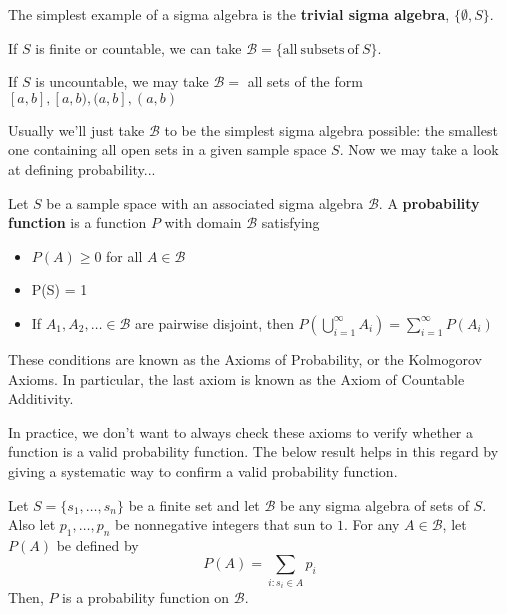 \begin{example}
    The simplest example of a sigma algebra is the \textbf{trivial sigma algebra}, $\{\emptyset, S\}$.
\end{example}

\begin{example}
    If $S$ is finite or countable, we can take $\mathcal{B} = \{\mathrm{all\ subsets\ of\ } S\}$.
\end{example}

\begin{example}
    If $S$ is uncountable, we may take $\mathcal{B} = $ all sets of the form $[a,b], [a,b),(a,b], (a,b)$
\end{example}
\nextp

Usually we'll just take $\mathcal{B}$ to be the simplest sigma algebra possible: the smallest one containing all open sets in a given sample space $S$. 
Now we may take a look at defining probability...
\begin{definition}
    Let $S$ be a sample space with an associated sigma algebra $\mathcal{B}$. A \textbf{probability function} is a function $P$ with domain $\mathcal{B}$ satisfying
    \begin{itemize}
        \item $P(A) \geq 0$ for all $A \in \mathcal{B}$
        \item P(S) = 1
        \item If $A_1, A_2, \dots \in \mathcal{B}$ are pairwise disjoint, then $P(\bigcup_{i=1}^{\infty}{A_i}) = \sum_{i=1}^{\infty}{P(A_i)}$
    \end{itemize}
    These conditions are known as the Axioms of Probability, or the Kolmogorov Axioms. In particular, the last axiom is known as the Axiom of Countable Additivity.
\end{definition}
\nextp

In practice, we don't want to always check these axioms to verify whether a function is a valid probability function. The below result helps in this regard by giving a systematic way to confirm a valid probability function.
\begin{theorem}
    Let $S = \{s_1, \dots, s_n\}$ be a finite set and let $\mathcal{B}$ be any sigma algebra of sets of $S$. Also let $p_1, \dots, p_n$ be nonnegative integers that sun to $1$. For any $A \in \mathcal{B}$, let $P(A)$ be defined by
    \[
    P(A) = \sum_{i: s_i \in A}{p_i}
    \]
    Then, $P$ is a probability function on $\mathcal{B}$.
\end{theorem}
\nextp

